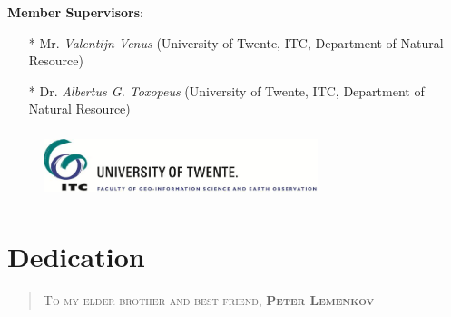 \documentclass[11pt]{article}
\begin{document}
\vspace{2em}

\textbf{Member Supervisors}: \\
\begin{itemize}
	\item[* ] Mr. \textit{Valentijn Venus}  \hfill{(University of Twente, ITC, Department of Natural Resource)}
	\item[* ] Dr. \textit{Albertus G. Toxopeus}  \hfill{(University of Twente, ITC, Department of Natural Resource)}
\end{itemize}

\begin{figure}[h]
	\begin{center}
	\includegraphics[height=2cm,width=8cm]{ITC-logo.jpg}
	\end{center}
\end{figure}
\pagebreak

\section*{}
	\tableofcontents 
\pagebreak

\clearpage
\section*{Dedication}
\newenvironment{dedication}
    {\vspace{16em}\begin{quotation}\begin{center}\begin{em}}
    {\par\end{em}\end{center}\end{quotation}}
\begin{dedication}
\large{\textsc{To my elder brother and best friend, \textbf{Peter Lemenkov}}}
\end{dedication}
\pagebreak
\end{document}

